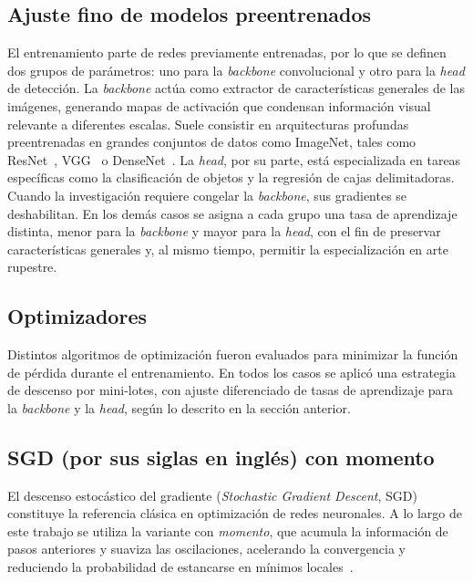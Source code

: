 \subsection{Ajuste fino de modelos preentrenados}

El entrenamiento parte de redes previamente entrenadas, por lo que se definen dos grupos de parámetros: uno para la \emph{backbone} convolucional y otro para la \emph{head} de detección.
La \emph{backbone} actúa como extractor de características generales de las imágenes, generando mapas de activación que condensan información visual relevante a diferentes escalas.
Suele consistir en arquitecturas profundas preentrenadas en grandes conjuntos de datos como ImageNet, tales como ResNet~\cite{he2016deep}, VGG~\cite{simonyan2014very} o DenseNet~\cite{huang2017densely}.
La \emph{head}, por su parte, está especializada en tareas específicas como la clasificación de objetos y la regresión de cajas delimitadoras.
Cuando la investigación requiere congelar la \emph{backbone}, sus gradientes se deshabilitan.
En los demás casos se asigna a cada grupo una tasa de aprendizaje distinta, menor para la \emph{backbone} y mayor para la \emph{head}, con el fin de preservar características generales y, al mismo tiempo, permitir la especialización en arte rupestre.

\subsection{Optimizadores}
Distintos algoritmos de optimización fueron evaluados para minimizar la función de pérdida durante el entrenamiento.
En todos los casos se aplicó una estrategia de descenso por mini-lotes, con ajuste diferenciado de tasas de aprendizaje para la \emph{backbone} y la \emph{head}, según lo descrito en la sección anterior.

\subsection*{SGD (por sus siglas en inglés) con momento}

El descenso estocástico del gradiente (\emph{Stochastic Gradient Descent}, SGD) constituye la referencia clásica en optimización de redes neuronales.
A lo largo de este trabajo se utiliza la variante con \emph{momento}, que acumula la información de pasos anteriores y suaviza las oscilaciones, acelerando la convergencia y reduciendo la probabilidad de estancarse en mínimos locales~\cite{robbins1951stochastic,qian1999momentum}.

